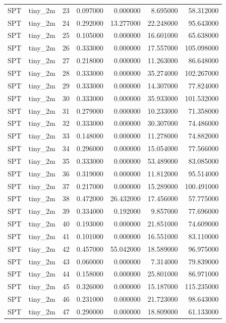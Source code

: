 \begin{tabular}{llrrrrr}
SPT & tiny_2m & 23 & 0.097000 & 0.000000 & 8.695000 & 58.312000 \\
SPT & tiny_2m & 24 & 0.292000 & 13.277000 & 22.248000 & 95.643000 \\
SPT & tiny_2m & 25 & 0.105000 & 0.000000 & 16.601000 & 65.638000 \\
SPT & tiny_2m & 26 & 0.333000 & 0.000000 & 17.557000 & 105.098000 \\
SPT & tiny_2m & 27 & 0.218000 & 0.000000 & 11.263000 & 86.648000 \\
SPT & tiny_2m & 28 & 0.333000 & 0.000000 & 35.274000 & 102.267000 \\
SPT & tiny_2m & 29 & 0.333000 & 0.000000 & 14.307000 & 77.824000 \\
SPT & tiny_2m & 30 & 0.333000 & 0.000000 & 35.933000 & 101.532000 \\
SPT & tiny_2m & 31 & 0.279000 & 0.000000 & 10.233000 & 71.358000 \\
SPT & tiny_2m & 32 & 0.333000 & 0.000000 & 30.307000 & 74.486000 \\
SPT & tiny_2m & 33 & 0.148000 & 0.000000 & 11.278000 & 74.882000 \\
SPT & tiny_2m & 34 & 0.296000 & 0.000000 & 15.054000 & 77.566000 \\
SPT & tiny_2m & 35 & 0.333000 & 0.000000 & 53.489000 & 83.085000 \\
SPT & tiny_2m & 36 & 0.319000 & 0.000000 & 11.812000 & 95.514000 \\
SPT & tiny_2m & 37 & 0.217000 & 0.000000 & 15.289000 & 100.491000 \\
SPT & tiny_2m & 38 & 0.472000 & 26.432000 & 17.456000 & 57.775000 \\
SPT & tiny_2m & 39 & 0.334000 & 0.192000 & 9.857000 & 77.696000 \\
SPT & tiny_2m & 40 & 0.193000 & 0.000000 & 21.851000 & 74.609000 \\
SPT & tiny_2m & 41 & 0.101000 & 0.000000 & 16.551000 & 83.110000 \\
SPT & tiny_2m & 42 & 0.457000 & 55.042000 & 18.589000 & 96.975000 \\
SPT & tiny_2m & 43 & 0.060000 & 0.000000 & 7.314000 & 79.839000 \\
SPT & tiny_2m & 44 & 0.158000 & 0.000000 & 25.801000 & 86.971000 \\
SPT & tiny_2m & 45 & 0.326000 & 0.000000 & 15.187000 & 115.235000 \\
SPT & tiny_2m & 46 & 0.231000 & 0.000000 & 21.723000 & 98.643000 \\
SPT & tiny_2m & 47 & 0.290000 & 0.000000 & 18.809000 & 61.133000 \\

\end{tabular}

